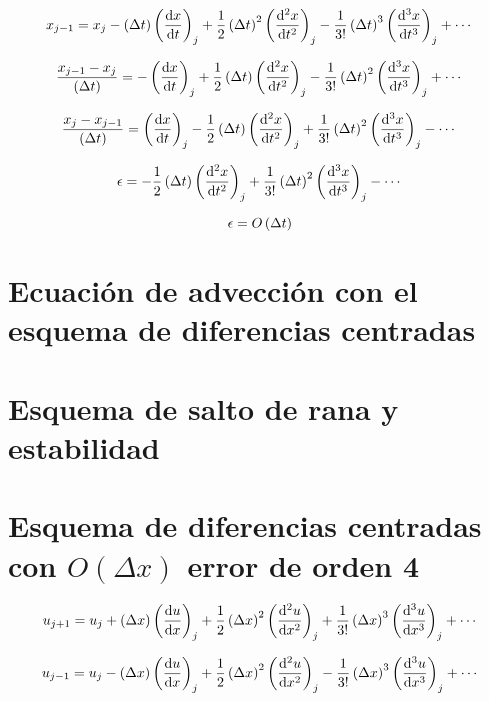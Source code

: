 \documentclass{article}
\begin{document}
\begin{equation}
x_{j-1} = x_j - \Dt\derord{x}{t} + \frac12\Dt^2\derord[2]{x}{t} - \frac1{3!}\Dt^3\derord[3]{x}{t} + \cdots
\end{equation}

\begin{equation}
\frac{x_{j-1} - x_j}{\Dt} = - \derord{x}{t} + \frac12\Dt\derord[2]{x}{t} - 
	\frac1{3!}\dxdero{x}{t}{3} + \cdots
\end{equation}

\begin{equation}
\frac{x_{j} - x_{j-1}}{\Dt} = \derord{x}{t} - \frac12\Dt\derord[2]{x}{t} + \frac1{3!}\dxdero{x}{t}{3} - \cdots
\end{equation}

\begin{equation}
\epsilon = - \frac12\Dt\derord[2]{x}{t} + \frac1{3!}\dxdero{x}{t}{3} - \cdots
\end{equation}

\begin{equation}
\epsilon = O\left( \Delta t \right)
\end{equation}

\section{Ecuación de advección con el esquema de diferencias centradas}
%
%

\section{Esquema de salto de rana y estabilidad}

\section{Esquema de diferencias centradas con \texorpdfstring{$O(\Delta x)$}{} error de orden 4}

\begin{equation}
u_{j+1} = u_j + \Dx\derord{u}{x} + \frac12\Dx^2\derord[2]{u}{x} + \frac1{3!}\Dx^3\derord[3]{u}{x} + \cdots
\label{eq:ujp1}
\end{equation}

\begin{equation}
u_{j-1} = u_j - \Dx\derord{u}{x} + \frac12\Dx^2\derord[2]{u}{x} - \frac1{3!}\Dx^3\derord[3]{u}{x} + \cdots
\label{eq:ujm1}
\end{equation}
\end{document}
